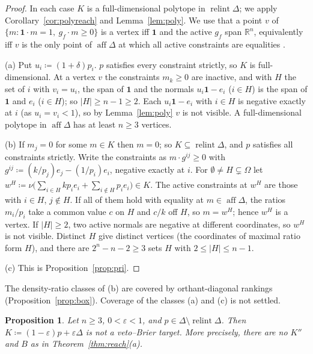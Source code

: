 \documentclass[11pt]{article}
\newcommand{\R}{\mathbb{R}}
\newcommand{\one}{\mathbf{1}}
\DeclareMathOperator{\relint}{relint}
\DeclareMathOperator{\aff}{aff}
\theoremstyle{plain}
\newtheorem{proposition}[theorem]{Proposition}
\theoremstyle{definition}
\theoremstyle{remark}
\begin{document}
\begin{proof}
In each case $K$ is a full-dimensional polytope in $\relint\Delta$; we apply
Corollary~\ref{cor:polyreach} and Lemma~\ref{lem:poly}. We use that a point $v$ of
$\{m:\one\cdot m=1,\ g_f\cdot m\ge0\}$ is a vertex iff $\one$ and the active $g_f$ span
$\R^n$, equivalently iff $v$ is the only point of $\aff\Delta$ at which all active
constraints are equalities \cite[Sec.~8.5]{Schrijver}. %

(a) Put $u_i\coloneqq(1+\delta)p_i$. $p$ satisfies every constraint strictly, so $K$ is
full-dimensional. At a vertex $v$ the constraints $m_k\ge0$ are inactive, and with $H$ the
set of $i$ with $v_i=u_i$, the span of $\one$ and the normals $u_i\one-e_i$ ($i\in H$)
is the span of $\one$ and $e_i$ ($i\in H$); so $|H|\ge n-1\ge2$. Each $u_i\one-e_i$ with
$i\in H$ is negative exactly at $i$ (as $u_i=v_i<1$), so by Lemma~\ref{lem:poly} $v$ is
not visible. A full-dimensional polytope in $\aff\Delta$ has at least $n\ge3$ vertices.

(b) If $m_j=0$ for some $m\in K$ then $m=0$; so $K\subseteq\relint\Delta$, and $p$
satisfies all constraints strictly. Write the constraints as $m\cdot g^{ij}\ge0$ with
$g^{ij}\coloneqq(k/p_j)e_j-(1/p_i)e_i$, negative exactly at $i$. For $\emptyset\neq H
\subsetneq\Omega$ let $w^H\coloneqq\nu\bigl(\sum_{i\in H}kp_ie_i+\sum_{i\notin H}p_ie_i
\bigr)\in K$. The active constraints at $w^H$ are those with $i\in H$, $j\notin H$. If all
of them hold with equality at $m\in\aff\Delta$, the ratios $m_i/p_i$ take a common value
$c$ on $H$ and $c/k$ off $H$, so $m=w^H$; hence $w^H$ is a vertex. If $|H|\ge2$, two
active normals are negative at different coordinates, so $w^H$ is not visible. Distinct
$H$ give distinct vertices (the coordinates of maximal ratio form $H$), and there are
$2^n-n-2\ge3$ sets $H$ with $2\le|H|\le n-1$.

(c) This is Proposition~\ref{prop:pri}.
\end{proof}

The density-ratio classes of (b) are covered by orthant-diagonal rankings
(Proposition~\ref{prop:box}). Coverage of the classes (a) and (c) is not settled.

\begin{proposition}\label{prop:contamzero}
Let $n\ge3$, $0<\varepsilon<1$, and $p\in\Delta\setminus\relint\Delta$. Then
$K\coloneqq(1-\varepsilon)p+\varepsilon\Delta$ is not a veto--Brier target. More precisely,
there are no $K''$ and $B$ as in Theorem~\ref{thm:reach}(a).
\end{proposition}
\end{document}
